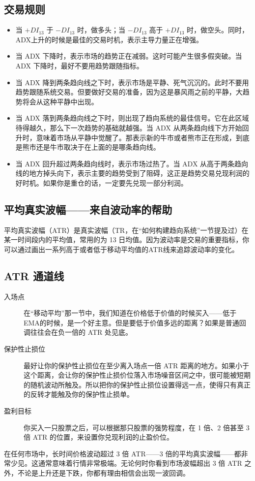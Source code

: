 \subsection*{交易规则}
\begin{itemize}
    \item 当 $+DI_{13}$ 于 $-DI_{13}$ 时，做多头；当 $-DI_{13}$ 高于 $+DI_{13}$ 时，做空头。同时，ADX上升的时候是最佳的交易时机，表示主导力量正在增强。
    \item 当 ADX 下降时，表示市场的趋势正在减弱。这时可能产生很多假突破。当 ADX 下降时，最好不要用趋势跟随指标。
    \item 当 ADX 降到两条趋向线之下时，表示市场是平静、死气沉沉的。此时不要用趋势跟随系统交易。但要做好交易的准备，因为这是暴风雨之前的平静，大趋势将会从这种平静中出现。
    \item 当 ADX 落到两条趋向线之下时，则出现了趋向系统的最佳信号。它在此区域待得越久，那么下一次趋势的基础就越强。当 ADX 从两条趋向线下方开始回升时，意味着市场从平静中觉醒了。那表示新的牛市或者熊市正在形成，到底是熊市还是牛市取决于在上面的是哪条趋向线。
    \item 当 ADX 回升超过两条趋向线时，表示市场过热了。当 ADX 从高于两条趋向线的地方掉头向下，表示主要的趋势受到了阻碍，这正是趋势交易兑现利润的好时机。如果你是重仓的话，一定要先兑现一部分利润。
\end{itemize}
\subsection*{平均真实波幅——来自波动率的帮助}
平均真实波幅（ATR）是真实波幅（TR，在“如何构建趋向系统”一节提及过）在某一时间段内的平均值，常用的为 13 日均值。因为波动率是交易的重要指标，你可以通过画出一系列高于或者低于移动平均值的ATR线来追踪波动率的变化。
\subsection*{ATR 通道线}
\begin{description}
    \item[入场点]在“移动平均”那一节中，我们知道在价格低于价值的时候买入——低于EMA的时候，是一个好主意。但是要低于价值多远的距离？如果是普通回调往往会在负一倍的 ATR 处见底。
    \item[保护性止损位]最好让你的保护性止损位在至少离入场点一倍 ATR 距离的地方。如果小于这个距离，会让你的保护性止损价位落入市场噪音区间之中，很可能被短期的随机波动所触及。所以把你的保护性止损位设置得远一点，使得只有真正的反转才能触及你的保护性止损单。
    \item[盈利目标]你买入一只股票之后，可以根据那只股票的强势程度，在 1 倍、2 倍甚至 3 倍 ATR 的位置，来设置你兑现利润的止盈价位。
\end{description}

在任何市场中，长时间价格波动超过 3 倍 ATR——3 倍的平均真实波幅——都非常少见。这通常意味着行情非常极端。无论何时你看到市场波幅超出 3 倍 ATR 之外，不论是上升还是下跌，你都有理由相信会出现一波回调。